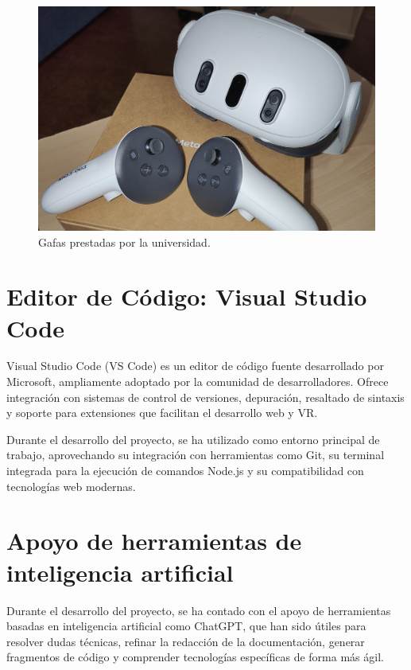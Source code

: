 \documentclass[a4paper, 12pt]{book}
\begin{document}
\begin{figure}[H]
  \centering
  \includegraphics[width=\textwidth]{img/gafas.jpg}
  \caption{Gafas prestadas por la universidad.}
  \label{fig:osm}
\end{figure}



\section{Editor de Código: Visual Studio Code}
\label{sec:vscode}

Visual Studio Code (VS Code) es un editor de código fuente desarrollado por Microsoft, ampliamente adoptado por la comunidad de desarrolladores. Ofrece integración con sistemas de control de versiones, depuración, resaltado de sintaxis y soporte para extensiones que facilitan el desarrollo web y VR.

Durante el desarrollo del proyecto, se ha utilizado como entorno principal de trabajo, aprovechando su integración con herramientas como Git, su terminal integrada para la ejecución de comandos Node.js y su compatibilidad con tecnologías web modernas.



\section{Apoyo de herramientas de inteligencia artificial}
\label{sec:ias}

Durante el desarrollo del proyecto, se ha contado con el apoyo de herramientas basadas en inteligencia artificial como ChatGPT, que han sido útiles para resolver dudas técnicas, refinar la redacción de la documentación, generar fragmentos de código y comprender tecnologías específicas de forma más ágil.
\end{document}

